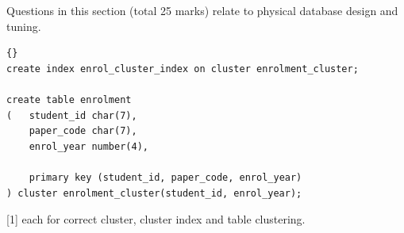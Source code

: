 \documentclass[markingschedule]{ouexam}
\begin{document}
\begin{examsection}{25}{}{Questions in this section (total 25 marks) relate to
physical database design and tuning.}
\begin{question}{5}
\begin{subquestion}{3}
\begin{marking}
\begin{lstlisting}[language={[Oracle8]SQL}]{}
create index enrol_cluster_index on cluster enrolment_cluster;

create table enrolment
(	student_id char(7),
	paper_code char(7),
	enrol_year number(4),
  
	primary key (student_id, paper_code, enrol_year)
) cluster enrolment_cluster(student_id, enrol_year);
			\end{lstlisting}
		\end{marking}
		[1] each for correct cluster, cluster index and table clustering.
	\end{subquestion}

\end{question}


\end{examsection}


\newpage


\end{document}
